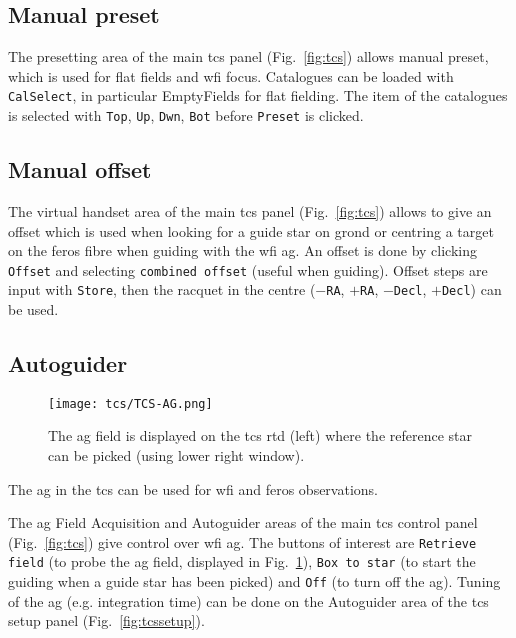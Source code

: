 \documentclass[11pt,fleqn]{book} %
\begin{document}
\subsection{Manual preset}  
\label{manualpreset}


The presetting area  of the main \gls{tcs} panel (Fig.~\ref{fig:tcs}) allows manual
preset, which is used for flat fields and \gls{wfi} focus.  Catalogues can be loaded
with \texttt{CalSelect}, in particular EmptyFields for flat fielding. The item
of the catalogues is selected with \texttt{Top}, \texttt{Up}, \texttt{Dwn},
\texttt{Bot} before \texttt{Preset} is clicked.

\subsection{Manual offset}
\label{manualoffset}

The virtual handset area of the main \gls{tcs} panel (Fig.~\ref{fig:tcs})
allows to give an offset which is used when looking for a guide star on
\gls{grond} or centring a target on the \gls{feros} fibre when guiding with the
\gls{wfi} \gls{ag}.  An offset is done by clicking \texttt{Offset} and
selecting \texttt{combined offset} (useful when guiding).  Offset steps are
input with \texttt{Store}, then the racquet in the centre (\texttt{$-$RA},
\texttt{$+$RA}, \texttt{$-$Decl}, \texttt{$+$Decl}) can be used.

\subsection{Autoguider}
\label{autoguider}

\begin{figure}[!ht]
\centering
\texttt{[image: tcs/TCS-AG.png]}
\caption[WFI autoguider]{The \gls{ag} field is displayed on the \gls{tcs} \gls{rtd} (left) where the
 reference star can be picked (using lower right window).} 
\label{fig:tcsag}
\end{figure}
The \gls{ag} in the \gls{tcs} can be used for \gls{wfi} and \gls{feros} observations.

The \gls{ag} Field Acquisition and Autoguider areas of the main \gls{tcs} control panel
(Fig.~\ref{fig:tcs}) give control over \gls{wfi} \gls{ag}.  The buttons of
interest are \texttt{Retrieve field} (to probe the \gls{ag} field, displayed
in Fig.~\ref{fig:tcsag}), \texttt{Box to
star} (to start the guiding when a guide star has been picked) and \texttt{Off}
(to turn off the \gls{ag}).  Tuning of the \gls{ag} (e.g. integration time) can be done 
on  the Autoguider area of the \gls{tcs} setup panel (Fig.~\ref{fig:tcssetup}).
\end{document}
